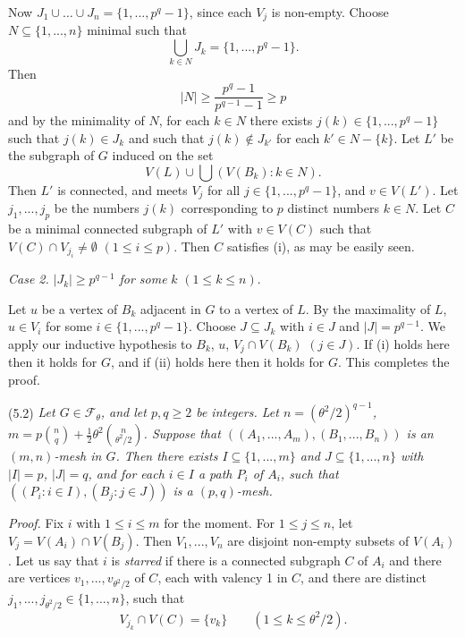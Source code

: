 Now $J_1 \cup \dots \cup J_n = \{1, ..., p^q - 1\}$, since each $V_j$ is non-empty. Choose $N \subseteq \{1, ..., n\}$ minimal such that
\begin{equation*}
\bigcup_{k \in N} J_k = \{1, ..., p^q - 1\}.
\end{equation*}
Then
\begin{equation*}
|N| \ge \frac{p^q - 1}{p^{q-1} - 1} \ge p
\end{equation*}
and by the minimality of $N$, for each $k \in N$ there exists $j(k) \in \{1, ..., p^q - 1\}$ such that $j(k) \in J_k$ and such that $j(k) \notin J_{k'}$ for each $k' \in N - \{k\}$. Let $L'$ be the subgraph of $G$ induced on the set
\begin{equation*}
V(L) \cup \bigcup (V(B_k) : k \in N).
\end{equation*}
Then $L'$ is connected, and meets $V_j$ for all $j \in \{1, ..., p^q - 1\}$, and $v \in V(L')$. Let $j_1, ..., j_p$ be the numbers $j(k)$ corresponding to $p$ distinct numbers $k \in N$. Let $C$ be a minimal connected subgraph of $L'$ with $v \in V(C)$ such that $V(C) \cap V_{j_i} \ne \emptyset$ $(1 \le i \le p)$. Then $C$ satisfies (i), as may be easily seen.

\textit{Case 2.} $|J_k| \ge p^{q-1}$ \textit{for some} $k$ $(1 \le k \le n)$.

Let $u$ be a vertex of $B_k$ adjacent in $G$ to a vertex of $L$. By the maximality of $L$, $u \in V_i$ for some $i \in \{1, ..., p^q - 1\}$. Choose $J \subseteq J_k$ with $i \in J$ and $|J| = p^{q-1}$. We apply our inductive hypothesis to $B_k$, $u$, $V_j \cap V(B_k)$ $(j \in J)$. If (i) holds here then it holds for $G$, and if (ii) holds here then it holds for $G$. This completes the proof.

\stmt
(5.2) \textit{Let $G \in \mathcal{F}_\theta$, and let $p, q \ge 2$ be integers. Let $n = (\theta^2/2)^{q-1}$, $m = p \binom{n}{q} + \frac{1}{2}\theta^2 \binom{n}{\theta^2/2}$. Suppose that $((A_1, ..., A_m), (B_1, ..., B_n))$ is an $(m, n)$-mesh in $G$. Then there exists $I \subseteq \{1, ..., m\}$ and $J \subseteq \{1, ..., n\}$ with $|I| = p$, $|J| = q$, and for each $i \in I$ a path $P_i$ of $A_i$, such that $((P_i : i \in I), (B_j : j \in J))$ is a $(p, q)$-mesh.}

\textit{Proof.} Fix $i$ with $1 \le i \le m$ for the moment. For $1 \le j \le n$, let $V_j = V(A_i) \cap V(B_j)$. Then $V_1, ..., V_n$ are disjoint non-empty subsets of $V(A_i)$. Let us say that $i$ is \textit{starred} if there is a connected subgraph $C$ of $A_i$ and there are vertices $v_1, ..., v_{\theta^2/2}$ of $C$, each with valency 1 in $C$, and there are distinct $j_1, ..., j_{\theta^2/2} \in \{1, ..., n\}$, such that
\begin{equation*}
V_{j_k} \cap V(C) = \{v_k\} \qquad (1 \le k \le \theta^2/2).
\end{equation*}
